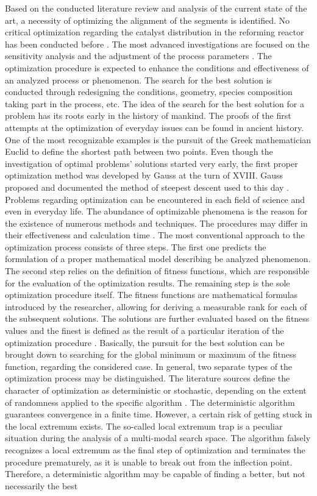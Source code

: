 \documentclass[preprint,12pt]{elsarticle}
\begin{document}
Based on the conducted literature review and analysis of the current state of the art, a necessity of optimizing the alignment of the segments is identified. No critical optimization regarding the catalyst distribution in the reforming reactor has been conducted before \cite{Heidebrecht2005, Li2022}. The most advanced investigations are focused on the sensitivity analysis and the adjustment of the process parameters \cite{Rajesh2000, Chen2005, Silva2015}. The optimization procedure is expected to enhance the conditions and effectiveness of an analyzed process or phenomenon. The search for the best solution is conducted through redesigning the conditions, geometry, species composition taking part in the process, etc. The idea of the search for the best solution for a problem has its roots early in the history of mankind. The proofs of the first attempts at the optimization of everyday issues can be found in ancient history.  One of the most recognizable examples is the pursuit of the Greek mathematician Euclid to define the shortest path between two points. Even though the investigation of optimal problems’  solutions started very early, the first proper optimization method was developed by Gauss at the turn of XVIII. Gauss proposed and documented the method of steepest descent used to this day \cite{Curry1944, Meza2010}. Problems regarding optimization can be encountered in each field of science and even in everyday life. The abundance of optimizable phenomena is the reason for the existence of numerous methods and techniques. The procedures may differ in their effectiveness and calculation time \cite{Kusiak2009}. The most conventional approach to the optimization process consists of three steps. The first one predicts the formulation of a proper mathematical model describing be analyzed phenomenon. The second step relies on the definition of fitness functions, which are responsible for the evaluation of the optimization results. The remaining step is the sole optimization procedure itself. The fitness functions are mathematical formulas introduced by the researcher, allowing for deriving a measurable rank for each of the subsequent solutions. The solutions are further evaluated based on the fitness values and the finest is defined as the result of a particular iteration of the optimization procedure \cite{Lange2004}. Basically, the pursuit for the best solution can be brought down to searching for the global minimum or maximum of the fitness function, regarding the considered case. In general, two separate types of the optimization process may be distinguished.  The literature sources define the character of optimization as deterministic or stochastic, depending on the extent of randomness applied to the specific algorithm \cite{Francisco2005}. The deterministic algorithm guarantees convergence in a finite time. However, a certain risk of getting stuck in the local extremum exists. The so-called local extremum trap is a peculiar situation during the analysis of a multi-modal search space. The algorithm falsely recognizes a local extremum as the final step of optimization and terminates the procedure prematurely, as it is unable to break out from the inflection point. Therefore, a deterministic algorithm may be capable of finding a better, but not necessarily the best 
\end{document}
